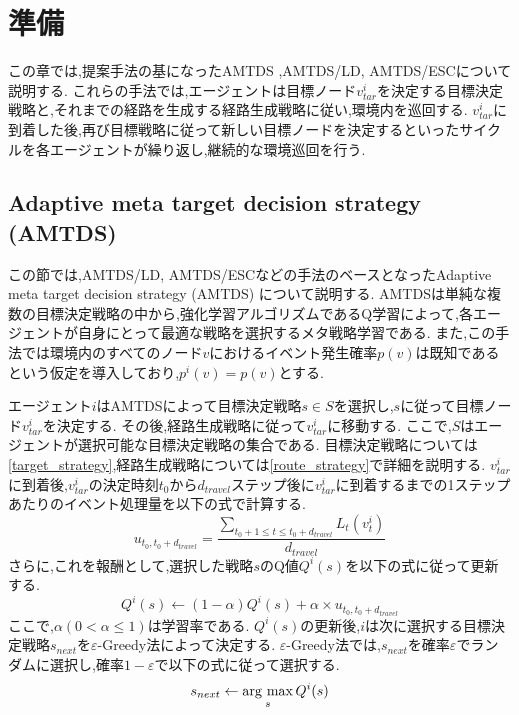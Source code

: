 \documentclass[12pt,a4j,twoside]{jarticle}
\newcommand{\argmax}{\mathop{\rm arg~max}\limits}
\begin{document}
\section{準備}
この章では,提案手法の基になったAMTDS ,AMTDS/LD, AMTDS/ESCについて説明する.
これらの手法では,エージェントは目標ノード$v^i_{tar}$を決定する目標決定戦略と,それまでの経路を生成する経路生成戦略に従い,環境内を巡回する.
$v^i_{tar}$に到着した後,再び目標戦略に従って新しい目標ノードを決定するといったサイクルを各エージェントが繰り返し,継続的な環境巡回を行う.

\subsection{Adaptive meta target decision strategy (AMTDS)}
\label{subsec:AMTDS}
この節では,AMTDS/LD, AMTDS/ESCなどの手法のベースとなったAdaptive meta target decision strategy (AMTDS) \cite{Yoneda2013}について説明する.
AMTDSは単純な複数の目標決定戦略の中から,強化学習アルゴリズムであるQ学習によって,各エージェントが自身にとって最適な戦略を選択するメタ戦略学習である.
また,この手法では環境内のすべてのノード$v$におけるイベント発生確率$p(v)$は既知であるという仮定を導入しており,$p^i(v) = p(v)$とする.

\par
エージェント$i$はAMTDSによって目標決定戦略$s \in S$を選択し,$s$に従って目標ノード$v^i_{tar}$を決定する.
その後,経路生成戦略に従って$v^i_{tar}$に移動する.
ここで,$S$はエージェントが選択可能な目標決定戦略の集合である.
目標決定戦略については\ref{target_strategy},経路生成戦略については\ref{route_strategy}で詳細を説明する.
$v^i_{tar}$に到着後,$v^i_{tar}$の決定時刻$t_0$から$d_{travel}$ステップ後に$v^i_{tar}$に到着するまでの1ステップあたりのイベント処理量を以下の式で計算する.
\begin{equation}
  \label{eq:reward_AMTDS}
  u_{t_0,t_0+d_{travel}} = \dfrac{\displaystyle\sum_{t_0+1 \leq t \leq t_0+d_{travel}} L_t(v^i_t)}{d_{travel}}
\end{equation}
さらに,これを報酬として,選択した戦略$s$のQ値$Q^i(s)$を以下の式に従って更新する.
\begin{equation}
  Q^i(s) \gets (1-\alpha)Q^i(s) + \alpha \times u_{t_0,t_0+d_{travel}}
\end{equation}
ここで,$\alpha (0 < \alpha \leq 1)$は学習率である.
$Q^i(s)$の更新後,$i$は次に選択する目標決定戦略$s_{next}$を$\varepsilon$-Greedy法によって決定する.
$\varepsilon$-Greedy法では,$s_{next}$を確率$\varepsilon$でランダムに選択し,確率$1 - \varepsilon$で以下の式に従って選択する.
\begin{equation}
  s_{next} \gets \argmax_{s} Q^i(s)
\end{equation}
\end{document}
